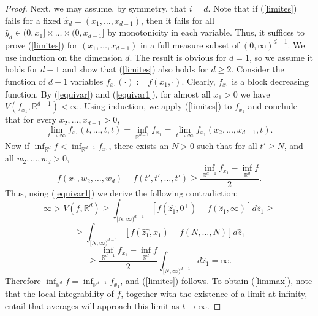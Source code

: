 \documentclass[12pt]{amsart}
\numberwithin{equation}{section}
\theoremstyle{plain}
\theoremstyle{definition}
\theoremstyle{remark}
\begin{document}
\begin{proof}
Next, we may assume, by symmetry,  that $i=d$. Note that
if (\ref{limites}) fails for a fixed
$\hat{x}_d = (x_1,\ldots,x_{d-1})$,  then it
fails for all $\hat{y}_d \in (0,x_1]\times\ldots \times(0,x_{d-1}]$
by monotonicity in each variable. Thus, it suffices
to prove (\ref{limites}) for $(x_1,\ldots,x_{d-1})$ in a
full measure subset of
$(0,\infty)^{d-1}$.
 We use induction on the dimension $d$.
The result is obvious for $d=1$, so we assume it holds for $d-1$
and show
 that
 (\ref{limites}) also holds  for $d\ge 2$.
   Consider the  function of $d-1$ variables
$f_{x_1}(\cdot):=f(x_1,\cdot)$. Clearly, $f_{x_1}$ is a
block decreasing function. By (\ref{equivar}) and (\ref{equivar1}), for almost all
$x_1>0$ we have $V(f_{x_1},\mathbb{R}^{d-1})<\infty$. Using induction,
we apply (\ref{limites}) to $f_{x_1}$ and
conclude that for every $x_2,\ldots,x_{d-1}>0$,
\begin{equation*}
  \lim_{t\to \infty}f_{x_1}(t,\ldots,t,t)= \inf_{\mathbb{R}^{d - 1}} f_{x_1}
  = \lim_{t\to
  \infty}f_{x_1}(x_2,\ldots,x_{d-1},t).
\end{equation*}
Now if $\inf_{\mathbb{R}^d} f < \inf_{\mathbb{R}^{d - 1}} f_{x_1}$,  there exists an $N>0$ such that for all $t'\ge N$, and all $w_2,\dots , w_d > 0$,
  \begin{equation*}
    f(x_1, w_2,\ldots, w_d)-f(t',t',\ldots,t') \ge
    \frac{\inf_{\mathbb{R}^{d - 1}} f_{x_1} - \inf_{\mathbb{R}^d} f}{2}.
  \end{equation*}
  Thus, using (\ref{equivar1}) we derive the following contradiction:
  \begin{equation*}
    \infty>V(f,\mathbb{R}^d)\ge
    \int_{[N,\infty)^{d-1}}[f(\hat{z_1},0^+)-f(\hat{z}_1,\infty)]d\hat{z}_1\ge
  \end{equation*}
  \begin{equation*}
    \ge
    \int_{[N,\infty)^{d-1}}[f(\hat{z_1},x_1)-f(N,\ldots,N)]d\hat{z}_1  \end{equation*}
\begin{equation*}
\ge \frac{\inf_{\mathbb{R}^{d - 1}} f_{x_1} - \inf_{\mathbb{R}^d} f}{2}
\int_{[N,\infty)^{d-1}} d\hat{z}_1  =\infty.
\end{equation*}
Therefore  $\inf_{\mathbb{R}^d} f = \inf_{\mathbb{R}^{d - 1}} f_{x_1}$,
and (\ref{limites}) follows. To obtain (\ref{limmax}), note that the local integrability of $f$, together
with the existence of a limit at infinity, entail that averages will
approach this limit as $t\to\infty$.
\end{proof}
\end{document}
